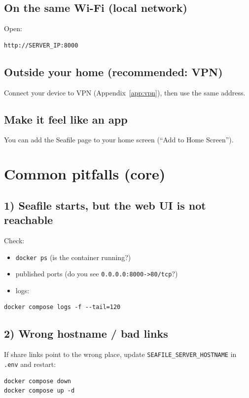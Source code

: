 \subsection*{On the same Wi-Fi (local network)}
Open:

\begin{lstlisting}
http://SERVER_IP:8000
\end{lstlisting}

\subsection*{Outside your home (recommended: VPN)}
Connect your device to VPN (Appendix~\ref{app:vpn}), then use the same address.

\subsection*{Make it feel like an app}
You can add the Seafile page to your home screen (``Add to Home Screen'').

\section{Common pitfalls (core)}
\subsection{1) Seafile starts, but the web UI is not reachable}
Check:
\begin{itemize}[leftmargin=*]
  \item \texttt{docker ps} (is the container running?)
  \item published ports (do you see \texttt{0.0.0.0:8000->80/tcp}?)
  \item logs:
\end{itemize}

\begin{lstlisting}
docker compose logs -f --tail=120
\end{lstlisting}

\subsection{2) Wrong hostname / bad links}
If share links point to the wrong place, update \texttt{SEAFILE\_SERVER\_HOSTNAME} in \texttt{.env}
and restart:

\begin{lstlisting}
docker compose down
docker compose up -d
\end{lstlisting}

